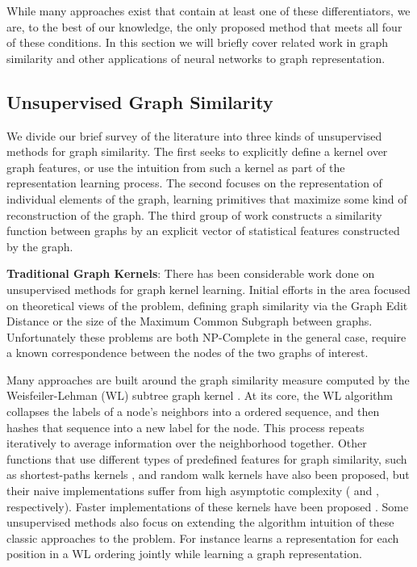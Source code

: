 \documentclass[sigconf]{acmart}
\begin{document}
\noindent While many approaches exist that contain at least one of these differentiators, we are, to the best of our knowledge, the only proposed method that meets all four of these conditions. 
In this section we will briefly cover related work in graph similarity and other applications of neural networks to graph representation.

\subsection{Unsupervised Graph Similarity}

We divide our brief survey of the literature into three kinds of unsupervised methods for graph similarity.
The first seeks to explicitly define a kernel over graph features, or use the intuition from such a kernel as part of the representation learning process.
The second focuses on the representation of individual elements of the graph, learning primitives that maximize some kind of reconstruction of the graph.  
The third group of work constructs a similarity function between graphs by an explicit vector of statistical features constructed by the graph.



\noindent \textbf{Traditional Graph Kernels}:
There has been considerable work done on unsupervised methods for graph kernel learning.
Initial efforts in the area focused on theoretical views of the problem, defining graph similarity via the Graph Edit Distance \cite{gao2010survey} or the size of the Maximum Common Subgraph \cite{bunke2002comparison} between graphs.  Unfortunately these problems are both NP-Complete in the general case, require a known correspondence between the nodes of the two graphs of interest.

Many approaches are built around the graph similarity measure computed by the Weisfeiler-Lehman (WL) subtree graph kernel \citep{shervashidze2011weisfeiler,kriege2016valid}.  
At its core, the WL algorithm collapses the labels of a node's neighbors into a ordered sequence, and then hashes that sequence into a new label for the node.
This process repeats iteratively to average information over the neighborhood together.
Other functions that use different types of predefined features for graph similarity, such as shortest-paths kernels \cite{borgwardt2005shortest}, and random walk kernels \cite{kashima2003marginalized} have also been proposed, but their naive implementations suffer from high asymptotic complexity ( and , respectively).
Faster implementations of these kernels have been proposed \cite{borgwardt2007fast,kang2012fast}.
Some unsupervised methods also focus on extending the algorithm intuition of these classic approaches to the problem.
For instance \cite{taheri2018RNN} learns a representation for each position in a WL ordering jointly while learning a graph representation.
\end{document}

